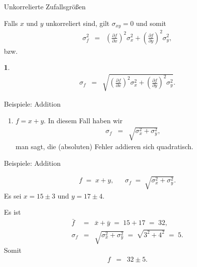 \documentclass[german]{beamer}
\newcommand{\bq}{\begin{eqnarray*}}
\newcommand{\eq}{\end{eqnarray*}}
\newtheorem*{myemptytheorem}{}
\begin{document}
\begin{frame}{Unkorrelierte Zufallsgr\"o{\ss}en}

Falls $x$ und $y$ unkorreliert sind, gilt $\sigma_{x y} = 0$ und somit
\bq
 \sigma_f^2 & = & 
         \left( \frac{\partial f}{\partial x} \right)^2 \sigma_x^2
       + \left( \frac{\partial f}{\partial y} \right)^2 \sigma_y^2,
\eq
bzw.
\begin{myemptytheorem}
\bq
 \sigma_f & = & 
         \sqrt{ \left( \frac{\partial f}{\partial x} \right)^2 \sigma_x^2
       + \left( \frac{\partial f}{\partial y} \right)^2 \sigma_y^2}.
\eq
\end{myemptytheorem}

\end{frame}

\begin{frame}{Beispiele: Addition}

\begin{enumerate}

\item $f=x+y$. In diesem Fall haben wir
\bq
 \sigma_f & = & \sqrt{\sigma_x^2 + \sigma_y^2},
\eq
man sagt, die (absoluten) Fehler addieren sich quadratisch.

\end{enumerate}

\end{frame}

\begin{frame}{Beispiele: Addition}

\begin{example}
\bq
 f \; = \; x+y,
 & & 
 \sigma_f \; = \; \sqrt{\sigma_x^2 + \sigma_y^2}.
\eq
Es sei $x=15\pm 3$ und $y=17\pm 4$.

\vspace*{5mm}
Es ist
\bq
 \bar{f} & = & \bar{x} + \bar{y} \; = \; 15 + 17 \; = \; 32,
 \nonumber \\
 \sigma_f & = & \sqrt{\sigma_x^2 + \sigma_y^2} \; = \; \sqrt{3^2 + 4^2} \; = \; 5.
\eq
Somit
\bq
 f & = & 32 \pm 5.
\eq
\end{example}

\end{frame}
\end{document}
